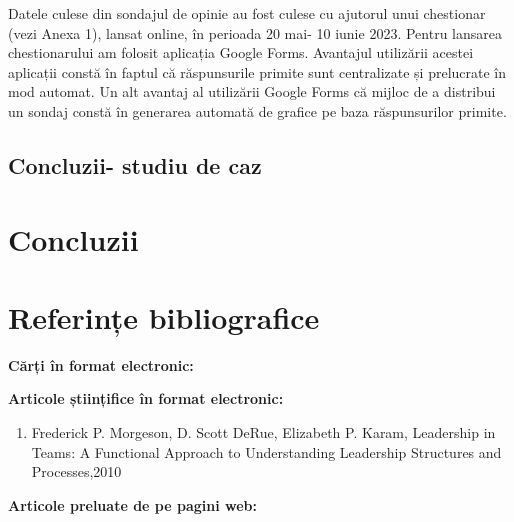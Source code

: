 \documentclass[a4paper, 12pt]{article}
\begin{document}
	\quad Datele culese din sondajul de opinie au fost culese cu ajutorul unui chestionar (vezi Anexa 1), lansat online, în perioada 20 mai- 10 iunie 2023. Pentru lansarea chestionarului am folosit aplicația Google Forms. Avantajul utilizării acestei aplicații constă în faptul că răspunsurile primite sunt centralizate și prelucrate în mod automat. Un alt avantaj al utilizării Google Forms că mijloc de a distribui un sondaj constă în generarea automată de grafice pe baza răspunsurilor primite. 

	\subsection{ Concluzii- studiu de caz}

\newpage
\setcounter{section}{3}
	\section{Concluzii}	






	
	







\newpage

	\section*{Referințe bibliografice}
	\space
	\bigskip
	\bigskip

	\textbf{Cărți în format electronic:}
	

	\textbf{Articole științifice în format electronic:}
	\begin{enumerate}[1.]
		\item Frederick P. Morgeson, D. Scott DeRue, Elizabeth P. Karam, Leadership in Teams: A Functional Approach to Understanding Leadership Structures and Processes,2010
	\end{enumerate}

	\textbf{Articole preluate de pe pagini web:}
\end{document}
